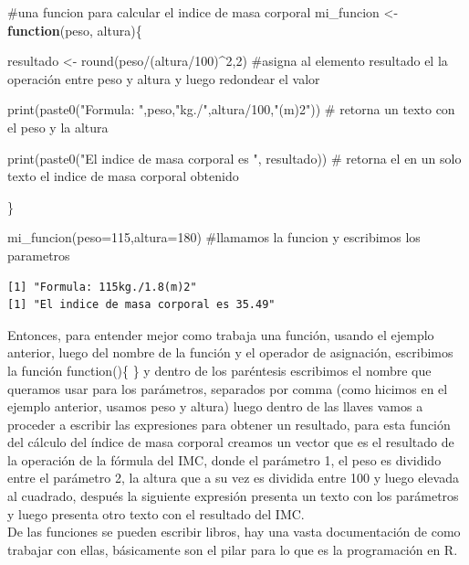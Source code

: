 \documentclass[
  letterpaper,
  DIV=11,
  numbers=noendperiod]{scrreprt}
\newenvironment{Shaded}{\begin{snugshade}}{\end{snugshade}}
\newcommand{\AttributeTok}[1]{\textcolor[rgb]{0.40,0.45,0.13}{#1}}
\newcommand{\CommentTok}[1]{\textcolor[rgb]{0.37,0.37,0.37}{#1}}
\newcommand{\ControlFlowTok}[1]{\textcolor[rgb]{0.00,0.23,0.31}{\textbf{#1}}}
\newcommand{\DecValTok}[1]{\textcolor[rgb]{0.68,0.00,0.00}{#1}}
\newcommand{\FunctionTok}[1]{\textcolor[rgb]{0.28,0.35,0.67}{#1}}
\newcommand{\NormalTok}[1]{\textcolor[rgb]{0.00,0.23,0.31}{#1}}
\newcommand{\OtherTok}[1]{\textcolor[rgb]{0.00,0.23,0.31}{#1}}
\newcommand{\SpecialCharTok}[1]{\textcolor[rgb]{0.37,0.37,0.37}{#1}}
\newcommand{\StringTok}[1]{\textcolor[rgb]{0.13,0.47,0.30}{#1}}
\begin{document}
\begin{Shaded}
\begin{Highlighting}[]
\CommentTok{\#una funcion para calcular el indice de masa corporal}
\NormalTok{mi\_funcion }\OtherTok{\textless{}{-}} \ControlFlowTok{function}\NormalTok{(peso, altura)\{ }
  
\NormalTok{  resultado }\OtherTok{\textless{}{-}} \FunctionTok{round}\NormalTok{(peso}\SpecialCharTok{/}\NormalTok{(altura}\SpecialCharTok{/}\DecValTok{100}\NormalTok{)}\SpecialCharTok{\^{}}\DecValTok{2}\NormalTok{,}\DecValTok{2}\NormalTok{) }\CommentTok{\#asigna al elemento resultado el la operación entre peso y altura y luego redondear el valor}
  
  \FunctionTok{print}\NormalTok{(}\FunctionTok{paste0}\NormalTok{(}\StringTok{"Formula: "}\NormalTok{,peso,}\StringTok{"kg./"}\NormalTok{,altura}\SpecialCharTok{/}\DecValTok{100}\NormalTok{,}\StringTok{"(m)2"}\NormalTok{)) }\CommentTok{\# retorna un texto con el peso y la altura}
  
  \FunctionTok{print}\NormalTok{(}\FunctionTok{paste0}\NormalTok{(}\StringTok{"El indice de masa corporal es "}\NormalTok{, resultado)) }\CommentTok{\# retorna el en un solo texto el indice de masa corporal obtenido}
  
\NormalTok{\}}

\FunctionTok{mi\_funcion}\NormalTok{(}\AttributeTok{peso=}\DecValTok{115}\NormalTok{,}\AttributeTok{altura=}\DecValTok{180}\NormalTok{) }\CommentTok{\#llamamos la funcion y escribimos los parametros}
\end{Highlighting}
\end{Shaded}

\begin{verbatim}
[1] "Formula: 115kg./1.8(m)2"
[1] "El indice de masa corporal es 35.49"
\end{verbatim}

Entonces, para entender mejor como trabaja una función, usando el
ejemplo anterior, luego del nombre de la función y el operador de
asignación, escribimos la función function()\{ \} y dentro de los
paréntesis escribimos el nombre que queramos usar para los parámetros,
separados por comma (como hicimos en el ejemplo anterior, usamos peso y
altura) luego dentro de las llaves vamos a proceder a escribir las
expresiones para obtener un resultado, para esta función del cálculo del
índice de masa corporal creamos un vector que es el resultado de la
operación de la fórmula del IMC, donde el parámetro 1, el peso es
dividido entre el parámetro 2, la altura que a su vez es dividida entre
100 y luego elevada al cuadrado, después la siguiente expresión presenta
un texto con los parámetros y luego presenta otro texto con el resultado
del IMC.\\
De las funciones se pueden escribir libros, hay una vasta documentación
de como trabajar con ellas, básicamente son el pilar para lo que es la
programación en R.
\end{document}
